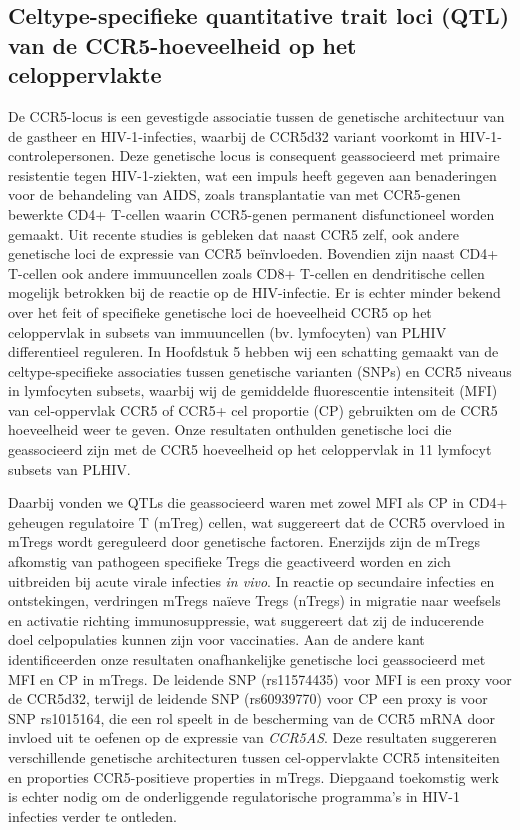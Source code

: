 \documentclass{book}
\begin{document}
\begin{refsection}
\subsection*{Celtype-specifieke quantitative trait loci (QTL) van de CCR5-hoeveelheid op het celoppervlakte}
De CCR5-locus is een gevestigde associatie tussen de genetische architectuur van de gastheer en HIV-1-infecties, waarbij de CCR5d32 variant voorkomt in HIV-1-controlepersonen.
Deze genetische locus is consequent geassocieerd met primaire resistentie tegen HIV-1-ziekten, wat een impuls heeft gegeven aan benaderingen voor de behandeling van AIDS, zoals transplantatie van met CCR5-genen bewerkte CD4+ T-cellen waarin CCR5-genen permanent disfunctioneel worden gemaakt.
Uit recente studies is gebleken dat naast CCR5 zelf, ook andere genetische loci de expressie van CCR5 beïnvloeden.
Bovendien zijn naast CD4+ T-cellen ook andere immuuncellen zoals CD8+ T-cellen en dendritische cellen mogelijk betrokken bij de reactie op de HIV-infectie.
Er is echter minder bekend over het feit of specifieke genetische loci de hoeveelheid CCR5 op het celoppervlak in subsets van immuuncellen (bv. lymfocyten) van PLHIV differentieel reguleren.
In Hoofdstuk 5 hebben wij een schatting gemaakt van de celtype-specifieke associaties tussen genetische varianten (SNPs) en CCR5 niveaus in lymfocyten subsets, waarbij wij de gemiddelde fluorescentie intensiteit (MFI) van cel-oppervlak CCR5 of CCR5+ cel proportie (CP) gebruikten om de CCR5 hoeveelheid weer te geven.
Onze resultaten onthulden genetische loci die geassocieerd zijn met de CCR5 hoeveelheid op het celoppervlak in 11 lymfocyt subsets van PLHIV.

Daarbij vonden we QTLs die geassocieerd waren met zowel MFI als CP in CD4+ geheugen regulatoire T (mTreg) cellen, wat suggereert dat de CCR5 overvloed in mTregs wordt gereguleerd door genetische factoren.
Enerzijds zijn de mTregs afkomstig van pathogeen specifieke Tregs die geactiveerd worden en zich uitbreiden bij acute virale infecties \textit{in vivo}.
In reactie op secundaire infecties en ontstekingen, verdringen mTregs naïeve Tregs (nTregs) in migratie naar weefsels en activatie richting immunosuppressie, wat suggereert dat zij de inducerende doel celpopulaties kunnen zijn voor vaccinaties.
Aan de andere kant identificeerden onze resultaten onafhankelijke genetische loci geassocieerd met MFI en CP in mTregs.
De leidende SNP (rs11574435) voor MFI is een proxy voor de CCR5d32, terwijl de leidende SNP (rs60939770) voor CP een proxy is voor SNP rs1015164, die een rol speelt in de bescherming van de CCR5 mRNA door invloed uit te oefenen op de expressie van \textit{CCR5AS}.
Deze resultaten suggereren verschillende genetische architecturen tussen cel-oppervlakte CCR5 intensiteiten en proporties CCR5-positieve properties in mTregs.
Diepgaand toekomstig werk is echter nodig om de onderliggende regulatorische programma's in HIV-1 infecties verder te ontleden.


\end{refsection}
\end{document}
